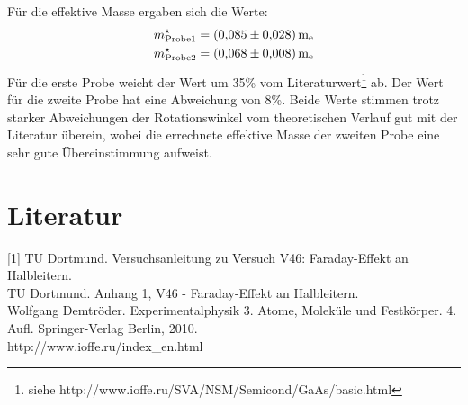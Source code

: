 Für die effektive Masse ergaben sich die Werte:
\begin{equation*} \label{eq:efmas}
\begin{split}
m^\star_\text{Probe1}& = \SI{0,085\pm0,028}{m_e}\\
m^\star_\text{Probe2}& = \SI{0,068\pm0,008}{m_e}
\end{split}
\end{equation*}
Für die erste Probe weicht der Wert um 35\% vom Literaturwert\footnote{siehe http://www.ioffe.ru/SVA/NSM/Semicond/GaAs/basic.html} ab.
Der Wert für die zweite Probe hat eine Abweichung von 8\%.
Beide Werte stimmen trotz starker Abweichungen der Rotationswinkel vom theoretischen Verlauf gut mit der Literatur überein, wobei die errechnete effektive Masse der zweiten Probe eine sehr gute Übereinstimmung aufweist.

















\section{Literatur}
\label{sec:literatur}
[1] TU Dortmund. Versuchsanleitung zu Versuch V46: Faraday-Effekt an Halbleitern.\\
[2] TU Dortmund. Anhang 1, V46 - Faraday-Effekt an Halbleitern.\\
[3] Wolfgang Demtröder. Experimentalphysik 3. Atome, Moleküle und Festkörper. 4. Aufl. Springer-Verlag Berlin, 2010.\\
[4] http://www.ioffe.ru/index_en.html\\